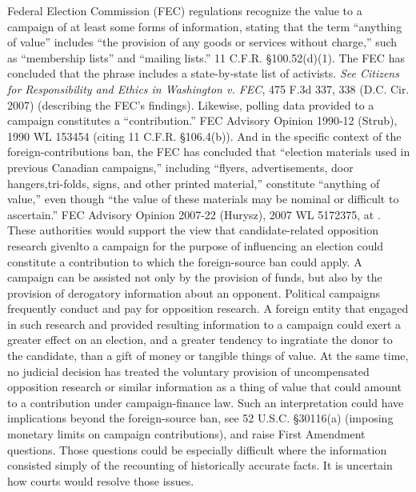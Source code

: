 Federal Election Commission (FEC) regulations recognize the value to a campaign of at least some forms of information, stating that the term ``anything of value'' includes ``the provision of any goods or services without charge,'' such as ``membership lists'' and ``mailing lists.''
11 C.F.R. \S 100.52(d)(1). 
The FEC has concluded that the phrase includes a state-by-state list of activists. 
\textit{See Citizens for Responsibility and Ethics in Washington v. FEC}, 475 F.3d 337, 338 (D.C. Cir. 2007) (describing the FEC's findings). 
Likewise, polling data provided to a campaign constitutes a ``contribution.''
FEC Advisory Opinion 1990-12 (Strub), 1990 WL 153454 (citing 11 C.F.R. \S 106.4(b)). 
And in the specific context of the foreign-contributions ban, the FEC has concluded that ``election materials used in previous Canadian campaigns,'' including ``flyers, advertisements, door hangers,tri-folds, signs, and other printed material,'' constitute ``anything of value,'' even though ``the value of these materials may be nominal or difficult to ascertain.''
FEC Advisory Opinion 2007-22 (Hurysz), 2007 WL 5172375, at . 
These authorities would support the view that candidate-related opposition research givenlto a campaign for the purpose of influencing an election could constitute a contribution to which the foreign-source ban could apply. 
A campaign can be assisted not only by the provision of funds, but also by the provision of derogatory information about an opponent. 
Political campaigns frequently conduct and pay for opposition research. 
A foreign entity that engaged in such research and provided resulting information to a campaign could exert a greater effect on an election, and a greater tendency to ingratiate the donor to the candidate, than a gift of money or tangible things of value. 
At the same time, no judicial decision has treated the voluntary provision of uncompensated opposition research or similar information as a thing of value that could amount to a contribution under campaign-finance law. 
Such an interpretation could have implications beyond the foreign-source ban, see 52 U.S.C. \S 30116(a) (imposing monetary limits on campaign contributions), and raise First Amendment questions. 
Those questions could be especially difficult where the information consisted simply of the recounting of historically accurate facts. 
It is uncertain how courts would resolve those issues.

